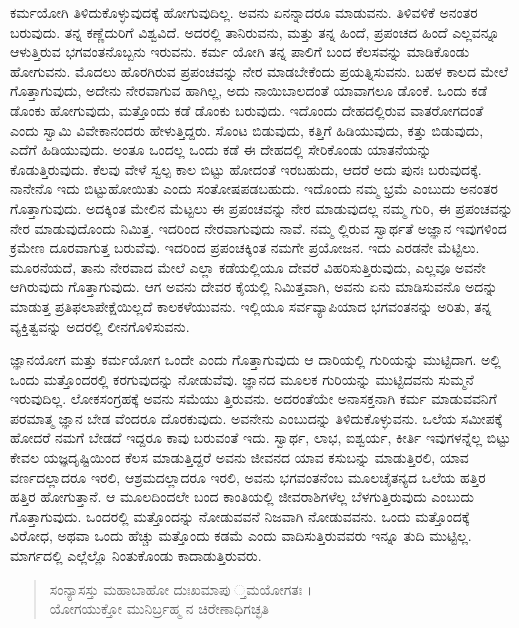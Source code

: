 ಕರ್ಮಯೋಗಿ ತಿಳಿದುಕೊಳ್ಳುವುದಕ್ಕೆ ಹೋಗುವುದಿಲ್ಲ. ಅವನು ಏನನ್ನಾದರೂ ಮಾಡುವನು. ತಿಳಿವಳಿಕೆ ಅನಂತರ ಬರುವುದು. ತನ್ನ ಕಣ್ಣೆದುರಿಗೆ ವಿಶ್ವವಿದೆ. ಅದರಲ್ಲಿ ತಾನಿರುವನು, ಮತ್ತು ತನ್ನ ಹಿಂದೆ, ಪ್ರಪಂಚದ ಹಿಂದೆ ಎಲ್ಲವನ್ನೂ ಆಳುತ್ತಿರುವ ಭಗವಂತನೊಬ್ಬನು ಇರುವನು. ಕರ್ಮ ಯೋಗಿ ತನ್ನ ಪಾಲಿಗೆ ಬಂದ ಕೆಲಸವನ್ನು ಮಾಡಿಕೊಂಡು ಹೋಗುವನು. ಮೊದಲು ಹೊರಗಿರುವ ಪ್ರಪಂಚವನ್ನು ನೇರ ಮಾಡಬೇಕೆಂದು ಪ್ರಯತ್ನಿಸುವನು. ಬಹಳ ಕಾಲದ ಮೇಲೆ ಗೊತ್ತಾಗುವುದು, ಅದೇನು ನೇರವಾಗುವ ಹಾಗಿಲ್ಲ, ಅದು ನಾಯಿಬಾಲದಂತೆ ಯಾವಾಗಲೂ ಡೊಂಕೆ. ಒಂದು ಕಡೆ ಡೊಂಕು ಹೋಗುವುದು, ಮತ್ತೊಂದು ಕಡೆ ಡೊಂಕು ಬರುವುದು. ಇದೊಂದು ದೇಹದಲ್ಲಿರುವ ವಾತರೋಗದಂತೆ ಎಂದು ಸ್ವಾಮಿ ವಿವೇಕಾನಂದರು ಹೇಳುತ್ತಿದ್ದರು. ಸೊಂಟ ಬಿಡುವುದು, ಕತ್ತಿಗೆ ಹಿಡಿಯುವುದು, ಕತ್ತು ಬಿಡುವುದು, ಎದೆಗೆ ಹಿಡಿಯುವುದು. ಅಂತೂ ಒಂದಲ್ಲ ಒಂದು ಕಡೆ ಈ ದೇಹದಲ್ಲಿ ಸೇರಿಕೊಂಡು ಯಾತನೆಯನ್ನು ಕೊಡುತ್ತಿರುವುದು. ಕೆಲವು ವೇಳೆ ಸ್ವಲ್ಪ ಕಾಲ ಬಿಟ್ಟು ಹೋದಂತೆ ಇರಬಹುದು, ಆದರೆ ಅದು ಪುನಃ ಬರುವುದಕ್ಕೆ. ನಾನೇನೊ ಇದು ಬಿಟ್ಟುಹೋಯಿತು ಎಂದು ಸಂತೋಷಪಡಬಹುದು. ಇದೊಂದು ನಮ್ಮ ಭ್ರಮೆ ಎಂಬುದು ಅನಂತರ ಗೊತ್ತಾಗುವುದು. ಅದಕ್ಕಿಂತ ಮೇಲಿನ ಮೆಟ್ಟಲು ಈ ಪ್ರಪಂಚವನ್ನು ನೇರ ಮಾಡುವುದಲ್ಲ ನಮ್ಮ ಗುರಿ, ಈ ಪ್ರಪಂಚವನ್ನು ನೇರ ಮಾಡುವುದೊಂದು ನಿಮಿತ್ತ. ಇದರಿಂದ ನೇರವಾಗುವುದು ನಾವೆ. ನಮ್ಮ ಲ್ಲಿರುವ ಸ್ವಾರ್ಥತೆ ಅಜ್ಞಾನ ಇವುಗಳಿಂದ ಕ್ರಮೇಣ ದೂರವಾಗುತ್ತ ಬರುವೆವು. ಇದರಿಂದ ಪ್ರಪಂಚಕ್ಕಿಂತ ನಮಗೇ ಪ್ರಯೋಜನ. ಇದು ಎರಡನೇ ಮೆಟ್ಟಿಲು. ಮೂರನೆಯದೆ, ತಾನು ನೇರವಾದ ಮೇಲೆ ಎಲ್ಲಾ ಕಡೆಯಲ್ಲಿಯೂ ದೇವರೆ ವಿಹರಿಸುತ್ತಿರುವುದು, ಎಲ್ಲವೂ ಅವನೇ ಆಗಿರುವುದು ಗೊತ್ತಾಗುವುದು. ಆಗ ಅವನು ದೇವರ ಕೈಯಲ್ಲಿ ನಿಮಿತ್ತವಾಗಿ, ಅವನು ಏನು ಮಾಡಿಸುವನೊ ಅದನ್ನು ಮಾಡುತ್ತ ಪ್ರತಿಫಲಾಪೇಕ್ಷೆಯಿಲ್ಲದೆ ಕಾಲಕಳೆಯುವನು. ಇಲ್ಲಿಯೂ ಸರ್ವವ್ಯಾಪಿಯಾದ ಭಗವಂತನನ್ನು ಅರಿತು, ತನ್ನ ವ್ಯಕ್ತಿತ್ವವನ್ನು ಅದರಲ್ಲಿ ಲೀನಗೊಳಿಸುವನು.

ಜ್ಞಾನಯೋಗ ಮತ್ತು ಕರ್ಮಯೋಗ ಒಂದೇ ಎಂದು ಗೊತ್ತಾಗುವುದು ಆ ದಾರಿಯಲ್ಲಿ ಗುರಿಯನ್ನು ಮುಟ್ಟಿದಾಗ. ಅಲ್ಲಿ ಒಂದು ಮತ್ತೊಂದರಲ್ಲಿ ಕರಗುವುದನ್ನು ನೋಡುವೆವು. ಜ್ಞಾನದ ಮೂಲಕ ಗುರಿಯನ್ನು ಮುಟ್ಟಿದವನು ಸುಮ್ಮನೆ ಇರುವುದಿಲ್ಲ. ಲೋಕಸಂಗ್ರಹಕ್ಕೆ ಅವನು ಸಮೆಯು ತ್ತಿರುವನು. ಅದರಂತೆಯೇ ಅನಾಸಕ್ತನಾಗಿ ಕರ್ಮ ಮಾಡುವವನಿಗೆ ಪರಮಾತ್ಮ ಜ್ಞಾನ ಬೇಡ ವೆಂದರೂ ದೊರಕುವುದು. ಅವನೇನು ಎಂಬುದನ್ನು ತಿಳಿದುಕೊಳ್ಳುವನು. ಒಲೆಯ ಸಮೀಪಕ್ಕೆ ಹೋದರೆ ನಮಗೆ ಬೇಡದೆ ಇದ್ದರೂ ಕಾವು ಬರುವಂತೆ ಇದು. ಸ್ವಾರ್ಥ, ಲಾಭ, ಐಶ್ವರ್ಯ, ಕೀರ್ತಿ ಇವುಗಳನ್ನೆಲ್ಲ ಬಿಟ್ಟು ಕೇವಲ ಯಜ್ಞದೃಷ್ಟಿಯಿಂದ ಕೆಲಸ ಮಾಡುತ್ತಿದ್ದರೆ ಅವನು ಜೀವನದ ಯಾವ ಕಸುಬನ್ನು ಮಾಡುತ್ತಿರಲಿ, ಯಾವ ವರ್ಣದಲ್ಲಾದರೂ ಇರಲಿ, ಆಶ್ರಮದಲ್ಲಾದರೂ ಇರಲಿ, ಅವನು ಭಗವಂತನೆಂಬ ಮೂಲಚೈತನ್ಯದ ಒಲೆಯ ಹತ್ತಿರ ಹತ್ತಿರ ಹೋಗುತ್ತಾನೆ. ಆ ಮೂಲದಿಂದಲೇ ಬಂದ ಕಾಂತಿಯಲ್ಲಿ ಜೀವರಾಶಿಗಳೆಲ್ಲ ಬೆಳಗುತ್ತಿರುವುದು ಎಂಬುದು ಗೊತ್ತಾಗುವುದು. ಒಂದರಲ್ಲಿ ಮತ್ತೊಂದನ್ನು ನೋಡುವವನೆ ನಿಜವಾಗಿ ನೋಡುವವನು. ಒಂದು ಮತ್ತೊಂದಕ್ಕೆ ವಿರೋಧ, ಅಥವಾ ಒಂದು ಹೆಚ್ಚು ಮತ್ತೊಂದು ಕಡಮೆ ಎಂದು ವಾದಿಸುತ್ತಿರುವವರು ಇನ್ನೂ ತುದಿ ಮುಟ್ಟಿಲ್ಲ. ಮಾರ್ಗದಲ್ಲಿ ಎಲ್ಲೆಲ್ಲೊ ನಿಂತುಕೊಂಡು ಕಾದಾಡುತ್ತಿರುವರು.

\begin{verse}
ಸಂನ್ಯಾಸಸ್ತು ಮಹಾಬಾಹೋ ದುಃಖಮಾಪು ್ತಮಯೋಗತಃ ।\\ಯೋಗಯುಕ್ತೋ ಮುನಿರ್ಬ್ರಹ್ಮ ನ ಚಿರೇಣಾಧಿಗಚ್ಛತಿ 
\end{verse}

